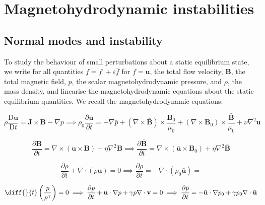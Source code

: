 \chapter{Magnetohydrodynamic instabilities}

\label{mhd-instabilities}

\section{Normal modes and instability}

To study the behaviour of small perturbations about a static equilibrium state, we write for all quantities $f=f^\square+\varepsilon\bar{f}$ for $f=\mathbf{u}$, the total flow velocity, $\mathbf{B}$, the total magnetic field, $p$, the scalar magnetohydrodynamic pressure, and $\rho$, the mass density, and linearise the magnetohydrodynamic equations about the static equilibrium quantities. We recall the magnetohydrodynamic equations:

\begin{equation}
    \label{eq-instability-1}
    \rho\frac{\mathrm{D}\mathbf{u}}{\mathrm{D}t}=\mathbf{J}\times\mathbf{B}-\nabla p\implies\rho_0\frac{\partial\bar{\mathbf{u}}}{\partial t}=-\nabla\bar{p}+(\nabla\times\bar{\mathbf{B}})\times\frac{\mathbf{B}_0}{\mu_0}+(\nabla\times\mathbf{B}_0)\times\frac{\bar{\mathbf{B}}}{\mu_0}+\nu\nabla^2\mathbf{u}
\end{equation}

\begin{equation}
    \label{eq-instability-2}
    \frac{\partial\mathbf{B}}{\partial t}=\nabla\times(\mathbf{u}\times\mathbf{B})+\eta\nabla^2\mathbf{B}\implies\frac{\partial\bar{\mathbf{B}}}{\partial t}=\nabla\times(\bar{\mathbf{u}}\times\mathbf{B}_0)+\eta\nabla^2\bar{\mathbf{B}}
\end{equation}

\begin{equation}
    \label{eq-instability-3}
    \frac{\partial\rho}{\partial t}+\nabla\cdot(\rho\mathbf{u})=0\implies\frac{\partial\bar{\rho}}{\partial t}=-\nabla\cdot(\rho_0\bar{\mathbf{u}})=
\end{equation}

\begin{equation}
    \label{eq-instability-4}
    \diff{}{t}\left(\frac{p}{\rho^\gamma}\right)=0\implies\frac{\partial p}{\partial t}+\mathbf{u}\cdot\nabla p+\gamma p\nabla\cdot\mathbf{v}=0\implies\frac{\partial\bar{p}}{\partial t}=-\bar{\mathbf{u}}\cdot\nabla p_0+\gamma p_0\nabla\cdot\bar{\mathbf{u}}
\end{equation}

